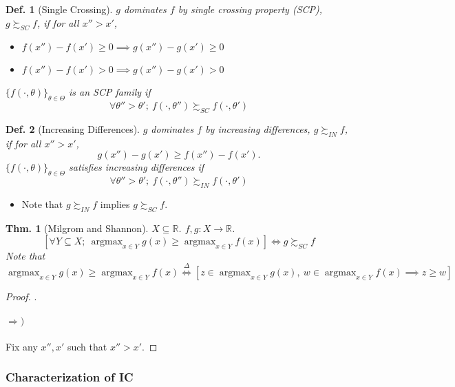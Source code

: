 \documentclass[11pt,a4paper,dvipdfmx]{article}
\theoremstyle{plain}
\newtheorem{thm}{Thm.}[section]
\newtheorem{df}{Def.}[section]
\newcommand{\R}{\mathbb{R}}
\newcommand{\defi}{\stackrel{\Delta}{\Longleftrightarrow}}
\newcommand{\equi}{\Longleftrightarrow}
\newcommand{\1}{\mathbbm{1}}
\DeclareMathOperator*{\argmax}{argmax}
\begin{document}
\begin{df}[Single Crossing]
	$g$ dominates $f$ by single crossing property (SCP), $g \succsim_{SC} f$, if for all $x'' > x'$,
	\begin{itemize}
		\item $f(x'') - f(x') \geq 0 \implies g(x'') - g(x') \geq 0$
		\item $f(x'') - f(x') > 0 \implies g(x'') - g(x') > 0$
	\end{itemize}
	
	$\{f(\cdot, \theta)\}_{\theta \in \Theta}$ is an SCP family if
	$$
	\forall \theta'' > \theta' ; \ f(\cdot, \theta'') \succsim_{SC} f(\cdot, \theta')
	$$
\end{df}

\begin{df}[Increasing Differences]
	$g$ dominates $f$ by increasing differences, $g \succsim_{IN} f$, if for all $x'' > x'$, $$g(x'') - g(x') \geq f(x'') - f(x').$$
	$\{f(\cdot, \theta)\}_{\theta \in \Theta}$ satisfies increasing differences if
	$$
	\forall \theta'' > \theta' ; \ f(\cdot, \theta'') \succsim_{IN} f(\cdot, \theta')
	$$
\end{df}

\begin{itemize}
	\item Note that $g \succsim_{IN} f$ implies $g \succsim_{SC} f$.
\end{itemize}

\begin{thm}[Milgrom and Shannon]
	$X \subseteq \R$. $f,g: X \to \R$.
	\[
	[\forall Y \subseteq X; \ \argmax_{x \in Y} g(x) \geq \argmax_{x \in Y} f(x)
	]
	\equi g \succsim_{SC} f
	\]
	Note that 
	\[
	\argmax_{x \in Y} g(x) \geq \argmax_{x \in Y} f(x)
	\defi  [z \in \argmax_{x \in Y} g(x), \ w \in \argmax_{x \in Y} f(x)
	\implies z \geq w
	]
	\]
\end{thm}
\begin{proof}.
	\paragraph{$\Rightarrow)$}
	Fix any $x'', x'$ such that $x'' > x'$.
\end{proof}

\subsubsection{Characterization of IC}
\end{document}
